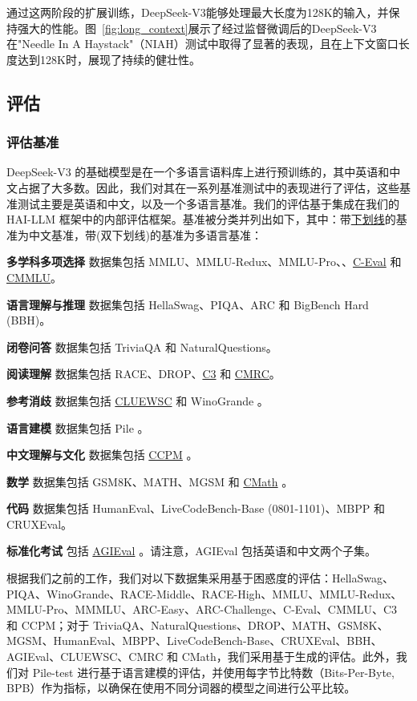 \documentclass[lang=cn,a4paper,newtx]{elegantpaper}
\newcommand{\dsviii}{DeepSeek-V3}
\begin{document}
通过这两阶段的扩展训练，\dsviii{}能够处理最大长度为128K的输入，并保持强大的性能。图~\ref{fig:long_context}展示了经过监督微调后的\dsviii{}在"Needle In A Haystack"（NIAH）测试中取得了显著的表现，且在上下文窗口长度达到128K时，展现了持续的健壮性。

\subsection{评估}

\subsubsection{评估基准}

\dsviii{} 的基础模型是在一个多语言语料库上进行预训练的，其中英语和中文占据了大多数。因此，我们对其在一系列基准测试中的表现进行了评估，这些基准测试主要是英语和中文，以及一个多语言基准。我们的评估基于集成在我们的 HAI-LLM 框架中的内部评估框架。基准被分类并列出如下，其中：带\underline{下划线}的基准为中文基准，带\uuline(双下划线)的基准为多语言基准：

\textbf{多学科多项选择} 数据集包括 MMLU、MMLU-Redux、MMLU-Pro、、\underline{C-Eval} 和 \underline{CMMLU}。

\textbf{语言理解与推理} 数据集包括 HellaSwag、PIQA、ARC 和 BigBench Hard (BBH)。

\textbf{闭卷问答} 数据集包括 TriviaQA 和 NaturalQuestions。

\textbf{阅读理解} 数据集包括 RACE、DROP、\underline{C3} 和 \underline{CMRC}。

\textbf{参考消歧} 数据集包括 \underline{CLUEWSC} 和 WinoGrande 。

\textbf{语言建模} 数据集包括 Pile 。

\textbf{中文理解与文化} 数据集包括 \underline{CCPM} 。

\textbf{数学} 数据集包括 GSM8K、MATH、MGSM 和 \underline{CMath} 。

\textbf{代码} 数据集包括 HumanEval、LiveCodeBench-Base (0801-1101)、MBPP 和 CRUXEval。

\textbf{标准化考试} 包括 \underline{AGIEval} 。请注意，AGIEval 包括英语和中文两个子集。

根据我们之前的工作，我们对以下数据集采用基于困惑度的评估：HellaSwag、PIQA、WinoGrande、RACE-Middle、RACE-High、MMLU、MMLU-Redux、MMLU-Pro、MMMLU、ARC-Easy、ARC-Challenge、C-Eval、CMMLU、C3 和 CCPM；对于 TriviaQA、NaturalQuestions、DROP、MATH、GSM8K、MGSM、HumanEval、MBPP、LiveCodeBench-Base、CRUXEval、BBH、AGIEval、CLUEWSC、CMRC 和 CMath，我们采用基于生成的评估。此外，我们对 Pile-test 进行基于语言建模的评估，并使用每字节比特数（Bits-Per-Byte, BPB）作为指标，以确保在使用不同分词器的模型之间进行公平比较。
\end{document}
